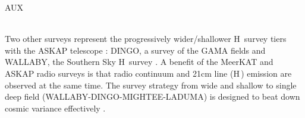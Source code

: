 {\begin{tasklist}{AUX}
\begin{task}
{~\\
Two other surveys represent the progressively wider/shallower H\,{} survey tiers with the ASKAP telescope \citep{johnston2007a}: DINGO, a survey of the GAMA fields \citep[][Meyer+ {\em in prep}]{driver2009a,duffy2012a,meyer2015a} and WALLABY, the Southern Sky H\,{} survey \citep[][Koribalski+ {\em in prep}]{duffy2012a}.
 A benefit of the MeerKAT and ASKAP radio surveys is that radio continuum and 21cm line (H\,{}) emission are observed at the same time. 
The survey strategy from wide and shallow to single deep field (WALLABY-DINGO-MIGHTEE-LADUMA) is designed to beat down cosmic variance effectively \citep[see e.g.,][]{maddox2016a}.
}
~\\
~\\
\end{task}



\end{tasklist}
}
